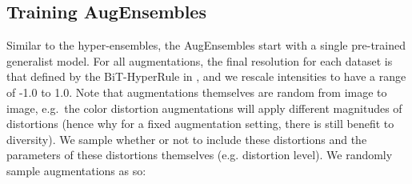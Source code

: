 \documentclass{article} \usepackage{iclr2021_conference,times}
\begin{document}
\subsection{Training AugEnsembles}
\label{app:training_aes}
Similar to the hyper-ensembles, the AugEnsembles start with a single pre-trained generalist model. For all augmentations, the final resolution for each dataset is that defined by the BiT-HyperRule in \citep{alex2019big}, and we rescale intensities to have a range of -1.0 to 1.0. Note that augmentations themselves are random from image to image, e.g.\ the color distortion augmentations will apply different magnitudes of distortions (hence why for a fixed augmentation setting, there is still benefit to diversity). We sample whether or not to include these distortions and the parameters of these distortions themselves (e.g. distortion level). We randomly sample augmentations as so:
\end{document}
